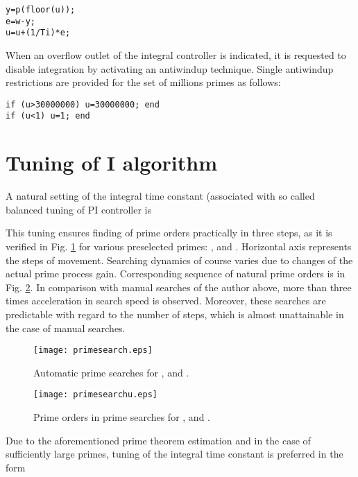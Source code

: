 \documentclass[12pt,a4paper,twoside]{article}
\begin{document}
\begin{verbatim}
y=p(floor(u));
e=w-y;
u=u+(1/Ti)*e;
\end{verbatim}
When an overflow outlet of the integral controller is indicated, it is requested to disable integration by activating an antiwindup technique. Single antiwindup restrictions are provided for the set of  millions primes as follows:

\begin{verbatim}
if (u>30000000) u=30000000; end
if (u<1) u=1; end
\end{verbatim}
   
\section{Tuning of I algorithm}   

\vspace{0.3cm}\noindent A natural setting of the integral time constant (associated with so called balanced tuning of PI controller \cite{kg2} is 

 
This tuning ensures finding of prime orders practically in three steps, as it is verified in Fig. \ref{primesearch} for various preselected primes: ,  and . Horizontal axis represents the steps of  movement. Searching dynamics of course varies due to changes of the actual prime process gain. Corresponding sequence of natural prime orders  is in Fig. \ref {primesearchu}. In comparison with manual searches of the author above, more than three times acceleration in search speed is observed. Moreover, these searches are predictable with regard to the number of steps, which is almost unattainable in the case of manual searches.

\begin{figure}[htbp]
\begin{center}
\texttt{[image: primesearch.eps]}
\end{center}
\caption{\small Automatic prime searches  for ,  and .}
\label{primesearch}
\end{figure}

\begin{figure}[htbp]
\begin{center}
\texttt{[image: primesearchu.eps]}
\end{center}
\caption{\small Prime orders  in prime searches for ,  and .}
\label{primesearchu}
\end{figure}

\vspace{0.3cm}\noindent Due to the aforementioned prime theorem estimation  and in the case of sufficiently large primes, tuning of the integral time constant is preferred in the form 
\end{document}
